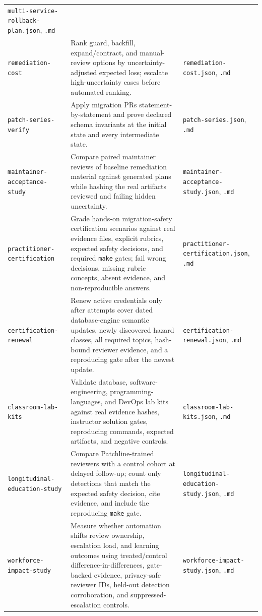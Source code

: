 \documentclass[11pt]{article}
\newcommand{\code}[1]{\texttt{#1}}
\begin{document}
\begin{longtable}{>{\raggedright\arraybackslash}p{2.3cm}>{\raggedright\arraybackslash}p{8.2cm}>{\raggedright\arraybackslash}p{3.4cm}}
\code{multi-service-rollback-plan.json}, \code{.md} \\
\code{remediation-cost} & Rank guard, backfill, expand/contract, and manual-review options by
uncertainty-adjusted expected loss; escalate high-uncertainty cases before automated ranking. &
\code{remediation-cost.json}, \code{.md} \\
\code{patch-series-verify} & Apply migration PRs statement-by-statement and prove declared schema
invariants at the initial state and every intermediate state. & \code{patch-series.json}, \code{.md} \\
\code{maintainer-acceptance-study} & Compare paired maintainer reviews of baseline remediation material
against generated plans while hashing the real artifacts reviewed and failing hidden uncertainty. &
\code{maintainer-acceptance-study.json}, \code{.md} \\
\code{practitioner-certification} & Grade hands-on migration-safety certification scenarios against
real evidence files, explicit rubrics, expected safety decisions, and required \code{make} gates; fail
wrong decisions, missing rubric concepts, absent evidence, and non-reproducible answers. &
\code{practitioner-certification.json}, \code{.md} \\
\code{certification-renewal} & Renew active credentials only after attempts cover dated
database-engine semantic updates, newly discovered hazard classes, all required topics, hash-bound
reviewer evidence, and a reproducing gate after the newest update. &
\code{certification-renewal.json}, \code{.md} \\
\code{classroom-lab-kits} & Validate database, software-engineering, programming-languages, and
DevOps lab kits against real evidence hashes, instructor solution gates, reproducing commands,
expected artifacts, and negative controls. & \code{classroom-lab-kits.json}, \code{.md} \\
\code{longitudinal-education-study} & Compare Patchline-trained reviewers with a control cohort at
delayed follow-up; count only detections that match the expected safety decision, cite evidence, and
include the reproducing \code{make} gate. & \code{longitudinal-education-study.json}, \code{.md} \\
\code{workforce-impact-study} & Measure whether automation shifts review ownership, escalation load,
and learning outcomes using treated/control difference-in-differences, gate-backed evidence, privacy-safe
reviewer IDs, held-out detection corroboration, and suppressed-escalation controls. &
\code{workforce-impact-study.json}, \code{.md} \\

\end{longtable}
\end{document}

